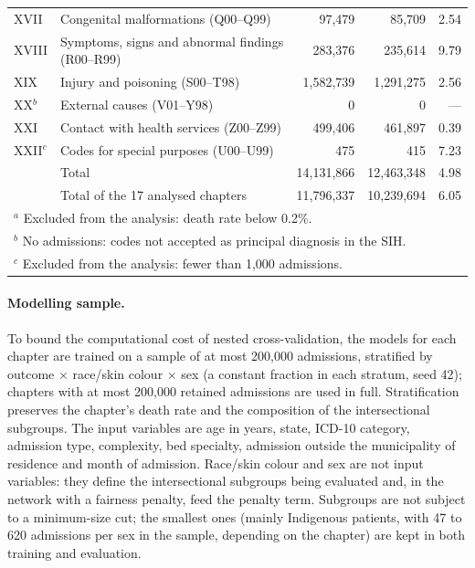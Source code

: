 \begin{table}[htbp]
\begin{tabular}{llrrr}
    XVII  & Congenital malformations (Q00--Q99)                 &    97,479 &    85,709 &  2.54 \\
    XVIII & Symptoms, signs and abnormal findings (R00--R99)    &   283,376 &   235,614 &  9.79 \\
    XIX   & Injury and poisoning (S00--T98)                     & 1,582,739 & 1,291,275 &  2.56 \\
    XX$^{b}$ & External causes (V01--Y98)                       &         0 &         0 &   --- \\
    XXI   & Contact with health services (Z00--Z99)             &   499,406 &   461,897 &  0.39 \\
    XXII$^{c}$ & Codes for special purposes (U00--U99)          &       475 &       415 &  7.23 \\
    \midrule
          & Total                                               & 14,131,866 & 12,463,348 & 4.98 \\
          & Total of the 17 analysed chapters                   & 11,796,337 & 10,239,694 & 6.05 \\
    \bottomrule
    \multicolumn{5}{l}{\footnotesize $^{a}$ Excluded from the analysis: death rate below 0.2\%.} \\
    \multicolumn{5}{l}{\footnotesize $^{b}$ No admissions: codes not accepted as principal diagnosis in the SIH.} \\
    \multicolumn{5}{l}{\footnotesize $^{c}$ Excluded from the analysis: fewer than 1,000 admissions.} \\
  \end{tabular}
\end{table}

\paragraph{Modelling sample.}
To bound the computational cost of nested cross-validation, the models for
each chapter are trained on a sample of at most 200,000 admissions, stratified
by outcome $\times$ race/skin colour $\times$ sex (a constant fraction in each
stratum, seed 42); chapters with at most 200,000 retained admissions are used
in full. Stratification preserves the chapter's death rate and the composition
of the intersectional subgroups. The input variables are age in years, state,
ICD-10 category, admission type, complexity, bed specialty, admission outside
the municipality of residence and month of admission. Race/skin colour and sex
are not input variables: they define the intersectional subgroups being
evaluated and, in the network with a fairness penalty, feed the penalty term.
Subgroups are not subject to a minimum-size cut; the smallest ones (mainly
Indigenous patients, with 47 to 620 admissions per sex in the sample,
depending on the chapter) are kept in both training and evaluation.

